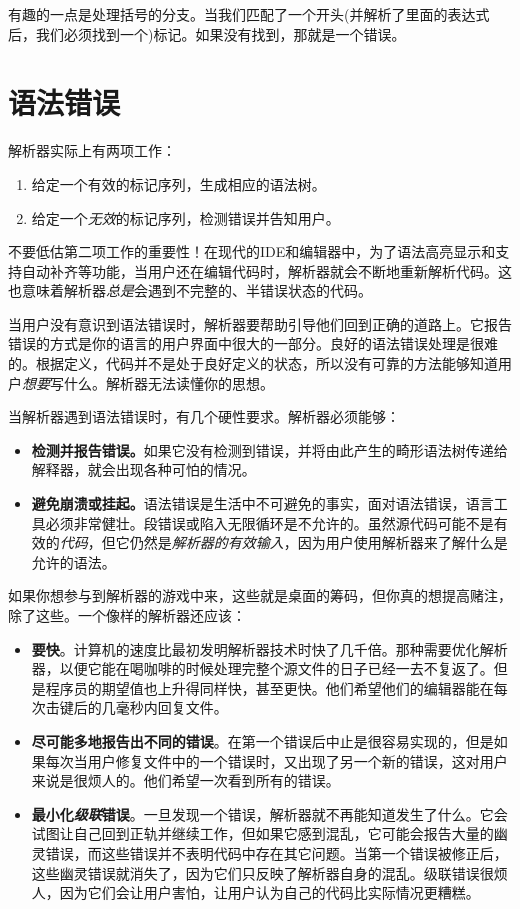 \documentclass[cn,11pt,chinese]{elegantbook}
\begin{document}
有趣的一点是处理括号的分支。当我们匹配了一个开头(并解析了里面的表达式后，我们必须找到一个)标记。如果没有找到，那就是一个错误。

\section{语法错误}

解析器实际上有两项工作：

\begin{enumerate}
  \item 给定一个有效的标记序列，生成相应的语法树。
  \item 给定一个\textit{无效}的标记序列，检测错误并告知用户。
\end{enumerate}

不要低估第二项工作的重要性！在现代的IDE和编辑器中，为了语法高亮显示和支持自动补齐等功能，当用户还在编辑代码时，解析器就会不断地重新解析代码。这也意味着解析器\textit{总是}会遇到不完整的、半错误状态的代码。

当用户没有意识到语法错误时，解析器要帮助引导他们回到正确的道路上。它报告错误的方式是你的语言的用户界面中很大的一部分。良好的语法错误处理是很难的。根据定义，代码并不是处于良好定义的状态，所以没有可靠的方法能够知道用户\textit{想要}写什么。解析器无法读懂你的思想。

当解析器遇到语法错误时，有几个硬性要求。解析器必须能够：

\begin{itemize}
  \item \textbf{检测并报告错误。}如果它没有检测到错误，并将由此产生的畸形语法树传递给解释器，就会出现各种可怕的情况。
  \item \textbf{避免崩溃或挂起。}语法错误是生活中不可避免的事实，面对语法错误，语言工具必须非常健壮。段错误或陷入无限循环是不允许的。虽然源代码可能不是有效的\textit{代码}，但它仍然是\textit{解析器的有效输入}，因为用户使用解析器来了解什么是允许的语法。
\end{itemize}

如果你想参与到解析器的游戏中来，这些就是桌面的筹码，但你真的想提高赌注，除了这些。一个像样的解析器还应该：

\begin{itemize}
  \item \textbf{要快}。计算机的速度比最初发明解析器技术时快了几千倍。那种需要优化解析器，以便它能在喝咖啡的时候处理完整个源文件的日子已经一去不复返了。但是程序员的期望值也上升得同样快，甚至更快。他们希望他们的编辑器能在每次击键后的几毫秒内回复文件。
  \item \textbf{尽可能多地报告出不同的错误}。在第一个错误后中止是很容易实现的，但是如果每次当用户修复文件中的一个错误时，又出现了另一个新的错误，这对用户来说是很烦人的。他们希望一次看到所有的错误。
  \item \textbf{最小化\textit{级联}错误}。一旦发现一个错误，解析器就不再能知道发生了什么。它会试图让自己回到正轨并继续工作，但如果它感到混乱，它可能会报告大量的幽灵错误，而这些错误并不表明代码中存在其它问题。当第一个错误被修正后，这些幽灵错误就消失了，因为它们只反映了解析器自身的混乱。级联错误很烦人，因为它们会让用户害怕，让用户认为自己的代码比实际情况更糟糕。
\end{itemize}
\end{document}
